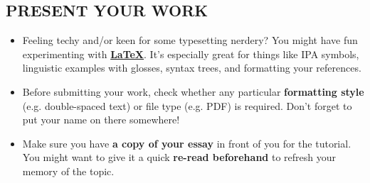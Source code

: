 \documentclass[10pt,a4paper]{article}
\begin{document}
\begin{multicols}{2}
\section*{PRESENT YOUR WORK}

\begin{itemize}
  \item	Feeling techy and/or keen for some typesetting nerdery? You might have
fun experimenting with
\href{https://en.wikibooks.org/wiki/LaTeX}{\textbf{\LaTeX}}. It's especially
great for things like IPA symbols, linguistic examples with glosses, syntax
trees, and formatting your references.
  \item	Before submitting your work, check whether any particular
\textbf{formatting style} (e.g. double-spaced text) or file type (e.g. PDF) is
required. Don’t forget to put your name on there somewhere!
  \item Make sure you have \textbf{a copy of your essay} in front of you for the
tutorial. You might want to give it a quick \textbf{re-read beforehand} to
refresh your memory of the topic.
\end{itemize}

\end{multicols}
\end{document}
